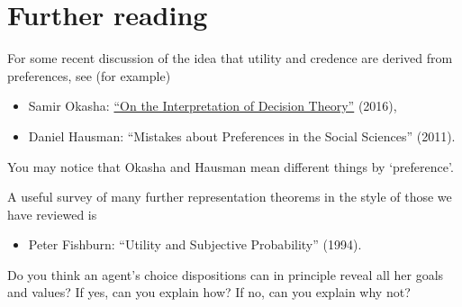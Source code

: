 \section{Further reading}

For some recent discussion of the idea that utility and credence are
derived from preferences, see (for example)

\begin{itemize}
\item Samir Okasha: \href{https://research-information.bristol.ac.uk/files/70387986/On_Interpretation_Decision_TheoryECONPHILrevised.pdf}{``On the Interpretation of Decision Theory''} (2016),
\item Daniel Hausman: ``Mistakes about Preferences in the Social
  Sciences'' (2011).
\end{itemize}
You may notice that Okasha and Hausman mean different things by
`preference'.

A useful survey of many further representation theorems in the style
of those we have reviewed is
\begin{itemize}
\item Peter Fishburn: ``Utility and Subjective Probability'' (1994).
\end{itemize}

\begin{essay}
  Do you think an agent's choice dispositions can in principle reveal
  all her goals and values? If yes, can you explain how? If no, can
  you explain why not?
\end{essay}








